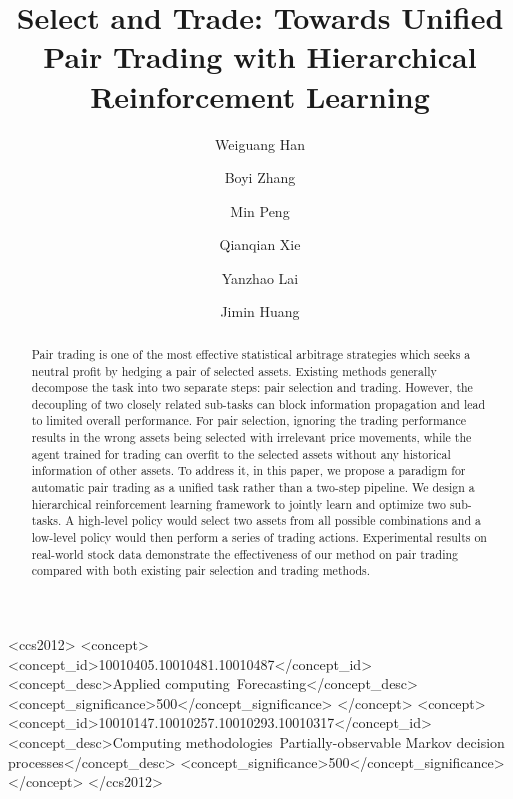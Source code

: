 \documentclass[sigconf]{acmart}
\begin{document}
\title{Select and Trade: Towards Unified Pair Trading with Hierarchical Reinforcement Learning}

\author{Weiguang Han}
\author{Boyi Zhang}
\author{Min Peng}
\author{Qianqian Xie}

\author{Yanzhao Lai}
\author{Jimin Huang}
\authornotemark[1]

\renewcommand{\shortauthors}{Han, et al.}

\begin{abstract}
    Pair trading is one of the most effective statistical arbitrage strategies which seeks a neutral profit by hedging a pair of selected assets. Existing methods generally decompose the task into two separate steps: pair selection and trading. However, the decoupling of two closely related sub-tasks can block information propagation and lead to limited overall performance. For pair selection, ignoring the trading performance results in the wrong assets being selected with irrelevant price movements, while the agent trained for trading can overfit to the selected assets without any historical information of other assets. To address it, in this paper, we propose a paradigm for automatic pair trading as a unified task rather than a two-step pipeline. We design a hierarchical reinforcement learning framework to jointly learn and optimize two sub-tasks. A high-level policy would select two assets from all possible combinations and a low-level policy would then perform a series of trading actions. Experimental results on real-world stock data demonstrate the effectiveness of our method on pair trading compared with both existing pair selection and trading methods.
\end{abstract}

\begin{CCSXML}
<ccs2012>
   <concept>
       <concept_id>10010405.10010481.10010487</concept_id>
       <concept_desc>Applied computing~Forecasting</concept_desc>
       <concept_significance>500</concept_significance>
       </concept>
   <concept>
       <concept_id>10010147.10010257.10010293.10010317</concept_id>
       <concept_desc>Computing methodologies~Partially-observable Markov decision processes</concept_desc>
       <concept_significance>500</concept_significance>
       </concept>
 </ccs2012>
\end{CCSXML}
\end{document}
